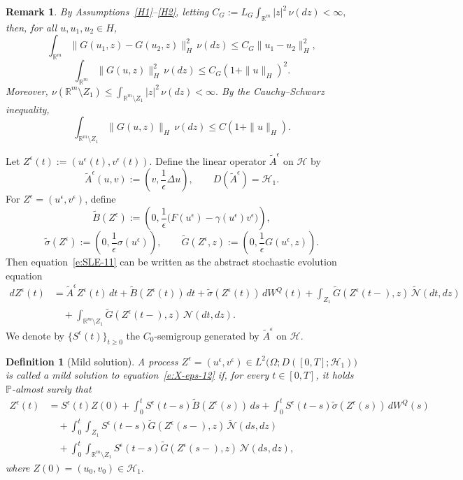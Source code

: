 \documentclass[11pt]{article}
\theoremstyle{plain}
\newtheorem{definition}[theorem]{Definition}
\newtheorem{remark}[theorem]{Remark}
\numberwithin{equation}{section}
\begin{document}
\begin{remark}\label{rem:G-estimates}
By Assumptions~\ref{H1}--\ref{H2},  letting \(C_G:=L_G\int_{\mathbb R^m}|z|^2\,\nu(dz)<\infty,\)
then, for all \(u,u_1,u_2\in H\),
\[
\int_{\mathbb R^m}\|G(u_1,z)-G(u_2,z)\|_H^2\,\nu(dz) \le C_G\|u_1-u_2\|_H^2,
\]
\[
\int_{\mathbb R^m}\|G(u,z)\|_H^2\,\nu(dz) \le C_G(1+\|u\|_H)^2.
\]
Moreover, \(\nu(\mathbb R^m\setminus Z_1)\le\int_{\mathbb R^m\setminus Z_1}|z|^2\,\nu(dz)<\infty.\)
 By the Cauchy--Schwarz inequality,
\[
\int_{\mathbb R^m\setminus Z_1}\|G(u,z)\|_H\,\nu(dz) \le C(1+\|u\|_H).
\]
\end{remark}
Let \(Z^\epsilon(t):=(u^\epsilon(t),v^\epsilon(t)).\) Define the linear operator \(\tilde A^\epsilon\) on \(\mathcal H\) by
\[
\tilde A^\epsilon(u,v):=\left(v,\frac1\epsilon\Delta u\right),\qquad D(\tilde A^\epsilon)=\mathcal H_1.
\]
For \(Z^\epsilon=(u^\epsilon,v^\epsilon)\), define
\[
\tilde B(Z^\epsilon):=\left(0,\frac1\epsilon\bigl(F(u^\epsilon)-\gamma(u^\epsilon)v^\epsilon\bigr)\right),
\]
\[
\tilde \sigma(Z^\epsilon)
:=\left(0,\frac1\epsilon\sigma(u^\epsilon)\right),\qquad\tilde G(Z^\epsilon,z):=\left(0,\frac1\epsilon G(u^\epsilon,z)\right).
\]
Then equation~\eqref{e:SLE-11} can be written as the abstract stochastic
evolution equation
\begin{align}\label{e:X-eps-12}
dZ^\epsilon(t)
&=\tilde A^\epsilon Z^\epsilon(t)\,dt+\tilde B(Z^\epsilon(t))\,dt+\tilde\sigma(Z^\epsilon(t))\,dW^Q(t)+\int_{Z_1}\tilde G(Z^\epsilon(t-),z)\,\tilde{\mathcal N}(dt,dz)\nonumber\\
&\quad+\int_{\mathbb R^m\setminus Z_1}\tilde G(Z^\epsilon(t-),z)\,\mathcal N(dt,dz).
\end{align}
We denote by \(\{S^\epsilon(t)\}_{t\ge0}\) the \(C_0\)-semigroup generated by \(\tilde A^\epsilon\) on \(\mathcal H\).

\begin{definition}[Mild solution]\label{def:P2}
A process \(Z^\epsilon=(u^\epsilon,v^\epsilon) \in L^2\bigl(\Omega;D([0,T];\mathcal H_1)\bigr) \)
is called a mild solution to equation~\eqref{e:X-eps-12} if, for every \(t\in[0,T]\), it holds \(\mathbb P\)-almost surely that
\begin{align}\label{mild-1}
Z^\epsilon(t)
&=S^\epsilon(t)Z(0)+\int_0^t S^\epsilon(t-s)\tilde B(Z^\epsilon(s))\,ds+ \int_0^t S^\epsilon(t-s)\tilde\sigma(Z^\epsilon(s))\,dW^Q(s) \nonumber\\
&\quad+ \int_0^t\int_{Z_1} S^\epsilon(t-s)\tilde G(Z^\epsilon(s-),z)\, \tilde{\mathcal N}(ds,dz) \nonumber\\
&\quad+\int_0^t\int_{\mathbb R^m\setminus Z_1} S^\epsilon(t-s)\tilde G(Z^\epsilon(s-),z)\, \mathcal N(ds,dz),
\end{align}
where \(Z(0)=(u_0,v_0)\in\mathcal H_1.\)
\end{definition}
\end{document}
